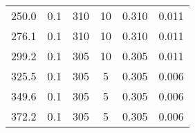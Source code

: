 \begin{tabular}{SSSSSS}
	250.0    & 0.1         & 310       & 10           & 0.310     & 0.011        \\
	276.1    & 0.1         & 310       & 10           & 0.310     & 0.011        \\
	299.2    & 0.1         & 305       & 10           & 0.305     & 0.011        \\
	325.5    & 0.1         & 305       & 5            & 0.305     & 0.006        \\
	349.6    & 0.1         & 305       & 5            & 0.305     & 0.006        \\
	372.2    & 0.1         & 305       & 5            & 0.305     & 0.006        \\ \bottomrule
\end{tabular}